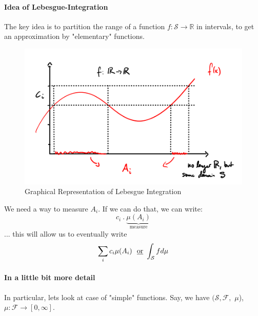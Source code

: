 \documentclass[10pt,a4paper]{article}
\theoremstyle{definition}
\theoremstyle{plain}
\begin{document}
\paragraph{Idea of Lebesgue-Integration} The key idea is to partition the range of a function $f: \mathcal{S} \to \mathbb{R}$ in intervals, to get an approximation by "elementary" functions.
\begin{figure}[H]
	\centering
	\includegraphics[width=0.7\linewidth]{lebesgue_idea}
	\caption{Graphical Representation of Lebesgue Integration}
	\label{fig:lebesgueidea}
\end{figure}
We need a way to measure $A_i$. If we can do that, we can write:
$$ c_{i} \ . \ \underbrace{\mu(A_i)}_{\text{measure}}$$
... this will allow us to eventually write
$$ \sum_{i} c_i \mu(A_i) \ \text{  \underline{or}  }  \int_{\mathcal{S}}f d\mu$$

\paragraph{In a little bit more detail} In particular, lets look at case of "simple" functions. Say, we have $\mathcal{(S, F,}$ $\mu$), $\mu: \mathcal{F} \to [0, \infty]$.
\end{document}
